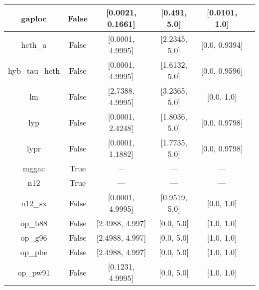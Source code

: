 \begin{tabular}{|c|c|c|c|c|l|}
        gaploc &                 False & [0.0021, 0.1661] &     [0.491, 5.0] &    [0.0101, 1.0] &                                        \cite{Fabiano2014_2016} \\ \hline
       hcth\_a &                 False & [0.0001, 4.9995] &    [2.2345, 5.0] &    [0.0, 0.9394] &                                      \cite{Hamprecht1998_6264} \\ \hline
hyb\_tau\_hcth &                 False & [0.0001, 4.9995] &    [1.6132, 5.0] &    [0.0, 0.9596] &                                          \cite{Boese2002_9559} \\ \hline
            lm &                 False & [2.7388, 4.9995] &    [3.2365, 5.0] &       [0.0, 1.0] &                             \cite{Langreth1981_446,Hu1985_391} \\ \hline
           lyp &                 False & [0.0001, 2.4248] &    [1.8036, 5.0] &    [0.0, 0.9798] &                            \cite{Lee1988_785,Miehlich1989_200} \\ \hline
          lypr &                 False & [0.0001, 1.1882] &    [1.7735, 5.0] &    [0.0, 0.9798] &                                             \cite{Ai2021_1207} \\ \hline
         mggac &                  True &              --- &              --- &              --- &                                        \cite{Patra2019_155140} \\ \hline
           n12 &                  True &              --- &              --- &              --- &                                       \cite{Peverati2012_2310} \\ \hline
       n12\_sx &                 False & [0.0001, 4.9995] &    [0.9519, 5.0] &       [0.0, 1.0] &                                      \cite{Peverati2012_16187} \\ \hline
       op\_b88 &                 False &  [2.4988, 4.997] &       [0.0, 5.0] &       [1.0, 1.0] &                                       \cite{Tsuneda1999_10664} \\ \hline
       op\_g96 &                 False &  [2.4988, 4.997] &       [0.0, 5.0] &       [1.0, 1.0] &                      \cite{Tsuneda1999_10664,Tsuneda1999_5656} \\ \hline
       op\_pbe &                 False &  [2.4988, 4.997] &       [0.0, 5.0] &       [1.0, 1.0] &                      \cite{Tsuneda1999_10664,Tsuneda1999_5656} \\ \hline
      op\_pw91 &                 False & [0.1231, 4.9995] &       [0.0, 5.0] &       [1.0, 1.0] &                      \cite{Tsuneda1999_10664,Tsuneda1999_5656} \\ \hline

\end{tabular}
